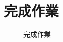 \chapter{完成作業}
\begin{figure}[hbt!]
\begin{center}
\caption{\Large 完成作業}
\label{完成作業}
\end{center}
\end{figure}
